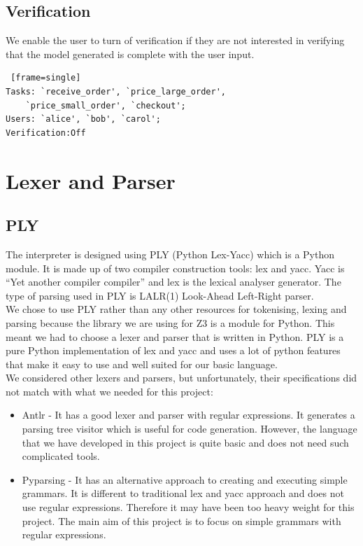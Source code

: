 \documentclass[a4paper]{report}
\begin{document}
\subsection{Verification}
We enable the user to turn of verification if they are not interested in verifying that the model generated is complete with the user input.
\begin{lstlisting} [frame=single]
Tasks: `receive_order', `price_large_order',
	`price_small_order', `checkout'; 
Users: `alice', `bob', `carol';
Verification:Off
\end{lstlisting}

\section{Lexer and Parser} 
\subsection{PLY}
The interpreter is designed using PLY\cite{ply} (Python Lex-Yacc) which is a Python module. It is made up of two compiler construction tools: lex and yacc\cite{plylexyacc}. Yacc is ``Yet another compiler compiler'' and lex is the lexical analyser generator. The type of parsing used in PLY is LALR(1)\cite{lalr} Look-Ahead Left-Right parser.\\

We chose to use PLY rather than any other resources for tokenising, lexing and parsing because the library we are using for Z3 is a module for Python. This meant we had to choose a lexer and parser that is written in Python. PLY is a pure Python implementation of lex and yacc and uses a lot of python features that make it easy to use and well suited for our basic language. \\

We considered other lexers and parsers, but unfortunately, their specifications did not match with what we needed for this project:
\begin{itemize}
\item Antlr\cite{antlr} - It has a good lexer and parser with regular expressions. It generates a parsing tree visitor which is useful for code generation. However, the language that we have developed in this project is quite basic and does not need such complicated tools.
\item Pyparsing\cite{pyparsing} - It has an alternative approach to creating and executing simple grammars. It is different to traditional lex and yacc approach and does not use regular expressions. Therefore it may have been too heavy weight for this project. The main aim of this project is to focus on simple grammars with regular expressions.
\end{itemize}
\end{document}
